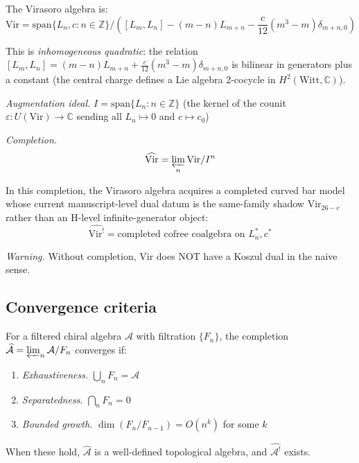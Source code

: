 \begin{example}\label{ex:virasoro-i-adic}
The Virasoro algebra is:
\[\text{Vir} = \text{span}\{L_n, c : n \in \mathbb{Z}\} / 
([L_m, L_n] - (m-n)L_{m+n} - \frac{c}{12}(m^3 - m)\delta_{m+n,0})\]

This is \emph{inhomogeneous quadratic}: the relation $[L_m, L_n] = (m-n)L_{m+n} + \frac{c}{12}(m^3-m)\delta_{m+n,0}$ is bilinear in generators plus a constant (the central charge defines a Lie algebra 2-cocycle in $H^2(\mathrm{Witt}, \mathbb{C})$).

\emph{Augmentation ideal.} $I = \text{span}\{L_n : n \in \mathbb{Z}\}$ (the kernel of the counit $\varepsilon: U(\mathrm{Vir}) \to \mathbb{C}$ sending all $L_n \mapsto 0$ and $c \mapsto c_0$)

\emph{Completion.}
\[\widehat{\text{Vir}} = \varprojlim_n \text{Vir} / I^n\]

In this completion, the Virasoro algebra acquires a completed curved bar
model whose current manuscript-level dual datum is the same-family
shadow $\mathrm{Vir}_{26-c}$ rather than an H-level infinite-generator
object:
\[\widehat{\text{Vir}^!} = \text{completed cofree coalgebra on } L_n^*, c^*\]

\emph{Warning.} Without completion, $\text{Vir}$ does NOT have a Koszul dual in 
the naive sense.
\end{example}

\subsection{Convergence criteria}

\begin{theorem}\label{thm:completion-convergence-criteria}
For a filtered chiral algebra $\mathcal{A}$ with filtration $\{F_n\}$, the 
completion $\widehat{\mathcal{A}} = \varprojlim_n \mathcal{A}/F_n$ converges if:
\begin{enumerate}
\item \emph{Exhaustiveness.} $\bigcup_n F_n = \mathcal{A}$
\item \emph{Separatedness.} $\bigcap_n F_n = 0$
\item \emph{Bounded growth.} $\dim(F_n / F_{n-1}) = O(n^k)$ for some $k$
\end{enumerate}

When these hold, $\widehat{\mathcal{A}}$ is a well-defined topological algebra, 
and $\widehat{\mathcal{A}^!}$ exists.
\end{theorem}

